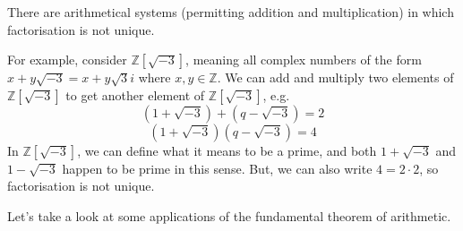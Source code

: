 \documentclass[10pt, a4paper, twoside]{report}
\begin{document}
\begin{remark}
    There are arithmetical systems (permitting addition and multiplication) in which factorisation is not unique.

    For example, consider \(\mathbb{Z}[\sqrt{-3}]\), meaning all complex numbers of the form \(x+y\sqrt{-3}=x+y\sqrt{3}i\) where \(x,y\in\mathbb{Z}\). We can add and multiply two elements of \(\mathbb{Z}[\sqrt{-3}]\) to get another element of \(\mathbb{Z}[\sqrt{-3}]\), e.g.
    \[(1+\sqrt{-3})+(q-\sqrt{-3})=2\]
    \[(1+\sqrt{-3})(q-\sqrt{-3})=4\]
     In \(\mathbb{Z}[\sqrt{-3}]\), we can define what it means to be a prime, and both \(1+\sqrt{-3}\) and \(1-\sqrt{-3}\) happen to be prime in this sense. But, we can also write \(4=2\cdot 2\), so factorisation is not unique.
\end{remark}
Let's take a look at some applications of the fundamental theorem of arithmetic.
\end{document}
